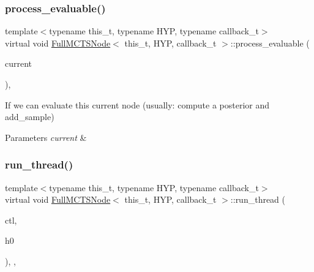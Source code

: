\subsubsection{\texorpdfstring{process\+\_\+evaluable()}{process\_evaluable()}}
{\footnotesize\ttfamily template$<$typename this\+\_\+t, typename H\+YP, typename callback\+\_\+t$>$ \\
virtual void \hyperlink{class_full_m_c_t_s_node}{Full\+M\+C\+T\+S\+Node}$<$ this\+\_\+t, H\+YP, callback\+\_\+t $>$\+::process\+\_\+evaluable (\begin{DoxyParamCaption}\item[{H\+YP \&}]{current }\end{DoxyParamCaption})\hspace{0.3cm}{\ttfamily [inline]}, {\ttfamily [virtual]}}



If we can evaluate this current node (usually\+: compute a posterior and add\+\_\+sample) 


\begin{DoxyParams}{Parameters}
{\em current} & \\
\hline
\end{DoxyParams}
\mbox{\label{class_full_m_c_t_s_node_acfdd0747aa1af7943995436a4aae1b26}} 
\subsubsection{\texorpdfstring{run\+\_\+thread()}{run\_thread()}}
{\footnotesize\ttfamily template$<$typename this\+\_\+t, typename H\+YP, typename callback\+\_\+t$>$ \\
virtual void \hyperlink{class_full_m_c_t_s_node}{Full\+M\+C\+T\+S\+Node}$<$ this\+\_\+t, H\+YP, callback\+\_\+t $>$\+::run\+\_\+thread (\begin{DoxyParamCaption}\item[{\hyperlink{struct_control}{Control}}]{ctl,  }\item[{H\+YP}]{h0 }\end{DoxyParamCaption})\hspace{0.3cm}{\ttfamily [inline]}, {\ttfamily [override]}, {\ttfamily [virtual]}}

\mbox{\label{class_full_m_c_t_s_node_a6996a784f6674edc7ac24fbc2b94d87a}} 
